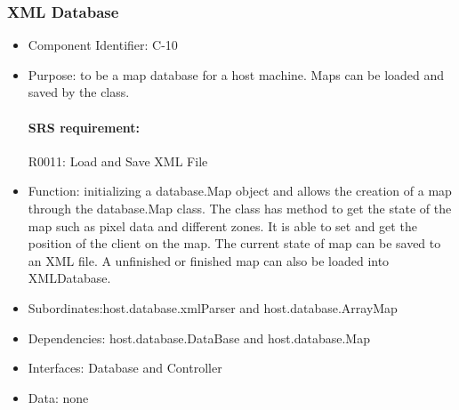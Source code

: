 \documentclass[11pt, a4paper]{report}
\begin{document}
\subsubsection{XML Database}
\begin{itemize}
\item Component Identifier: C-10
\item Purpose: to be a map database for a host machine. Maps can be loaded and saved by the
class.
\paragraph{SRS requirement:} R0011: Load and Save XML File
\item Function: initializing a  database.Map object and allows the creation of a map through
the database.Map class. The class has method to get the state of the map such as pixel data and
different zones. It is able to set and get the position of the client on the map. The current state
of map can be saved to an XML file. A unfinished or finished map can also be loaded into XMLDatabase.
\item Subordinates:host.database.xmlParser and host.database.ArrayMap
\item Dependencies: host.database.DataBase and host.database.Map
\item Interfaces: Database and Controller
\item Data: none
\end{itemize}

\end{document}
